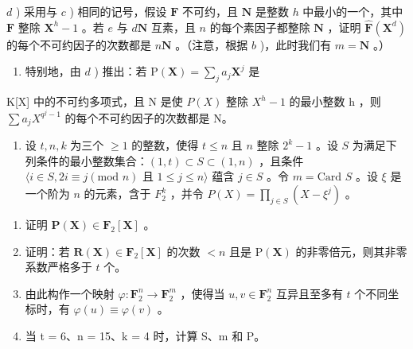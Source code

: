 \(d\) ) 采用与 \(c\) ) 相同的记号，假设 \(\mathbf{F}\) 不可约，且 \(\mathbf{N}\) 是整数 \(h\) 中最小的一个，其中 \(\mathbf{F}\) 整除 \(\mathbf{X}^h - 1\) 。若 \(e\) 与 \(d\mathbf{N}\) 互素，且 \(n\) 的每个素因子都整除 \(\mathbf{N}\) ，证明 \(\hat{\mathbf{F}}(\mathbf{X}^d)\) 的每个不可约因子的次数都是 \(n\mathbf{N}\) 。（注意，根据 \(b\) )，此时我们有 \(m = \mathbf{N}\) 。）

\begin{enumerate}
\def\labelenumi{\alph{enumi})}
\setcounter{enumi}{4}
\tightlist
\item
  特别地，由 \(d\) ) 推出：若 \(\mathrm{P}(\mathbf{X}) = \sum_{j} a_j \mathbf{X}^j\) 是
\end{enumerate}

K{[}X{]} 中的不可约多项式，且 N 是使 \(P(X)\) 整除 \(X^{h}-1\) 的最小整数 h ，则 \(\sum a_{j}X^{q^{j}-1}\) 的每个不可约因子的次数都是 N。

\begin{enumerate}
\def\labelenumi{\arabic{enumi})}
\setcounter{enumi}{9}
\tightlist
\item
  设 \(t, n, k\) 为三个 \(\geqslant 1\) 的整数，使得 \(t \leqslant n\) 且 \(n\) 整除 \(2^k - 1\) 。设 \(S\) 为满足下列条件的最小整数集合：\((1, t) \subset S \subset (1, n)\) ，且条件 \(\langle i \in S, 2i \equiv j (\text{mod } n) \text{ 且 } 1 \leqslant j \leqslant n \rangle\) 蕴含 \(j \in S\) 。令 \(m = \text{Card } S\) 。设 \(\xi\) 是一个阶为 \(n\) 的元素，含于 \(F_2^k\) ，并令 \(P(X) = \prod_{j \in S} (X - \xi^j)\) 。
\end{enumerate}

\begin{enumerate}
\def\labelenumi{\alph{enumi})}
\item
  证明 \(\mathbf{P}(\mathbf{X})\in \mathbf{F}_2[\mathbf{X}]\) 。
\item
  证明：若 \(\mathbf{R}(\mathbf{X})\in \mathbf{F}_2[\mathbf{X}]\) 的次数 \(< n\) 且是 \(\mathrm{P}(\mathbf{X})\) 的非零倍元，则其非零系数严格多于 \(t\) 个。
\item
  由此构作一个映射 \(\varphi: \mathbf{F}_2^n \to \mathbf{F}_2^m\) ，使得当 \(u, v \in \mathbf{F}_2^n\) 互异且至多有 \(t\) 个不同坐标时，有 \(\varphi(u) \equiv \varphi(v)\) 。
\item
  当 t = 6、n = 15、k = 4 时，计算 S、m 和 P。
\end{enumerate}


